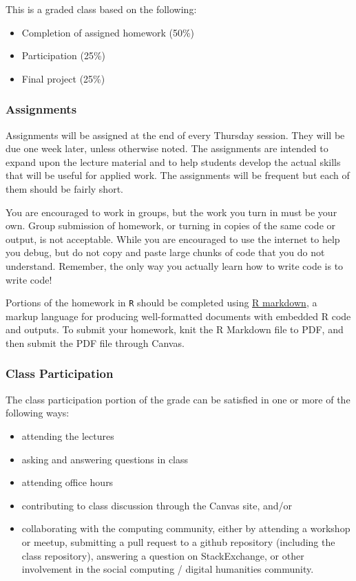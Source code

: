 \documentclass[]{book}
\providecommand{\tightlist}{%
  \setlength{\itemsep}{0pt}\setlength{\parskip}{0pt}}
\begin{document}
This is a graded class based on the following:

\begin{itemize}
\tightlist
\item
  Completion of assigned homework (50\%)
\item
  Participation (25\%)
\item
  Final project (25\%)
\end{itemize}

\subsubsection*{Assignments}\label{assignments}

Assignments will be assigned at the end of every Thursday session. They
will be due one week later, unless otherwise noted. The assignments are
intended to expand upon the lecture material and to help students
develop the actual skills that will be useful for applied work. The
assignments will be frequent but each of them should be fairly short.

You are encouraged to work in groups, but the work you turn in must be
your own. Group submission of homework, or turning in copies of the same
code or output, is not acceptable. While you are encouraged to use the
internet to help you debug, but do not copy and paste large chunks of
code that you do not understand. Remember, the only way you actually
learn how to write code is to write code!

Portions of the homework in \texttt{R} should be completed using
\href{https://rmarkdown.rstudio.com/}{R markdown}, a markup language for
producing well-formatted documents with embedded R code and outputs. To
submit your homework, knit the R Markdown file to PDF, and then submit
the PDF file through Canvas.

\subsubsection*{Class Participation}\label{class-participation}

The class participation portion of the grade can be satisfied in one or
more of the following ways:

\begin{itemize}
\tightlist
\item
  attending the lectures
\item
  asking and answering questions in class
\item
  attending office hours
\item
  contributing to class discussion through the Canvas site, and/or
\item
  collaborating with the computing community, either by attending a
  workshop or meetup, submitting a pull request to a github repository
  (including the class repository), answering a question on
  StackExchange, or other involvement in the social computing / digital
  humanities community.
\end{itemize}
\end{document}
